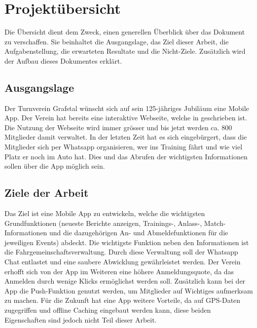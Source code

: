%
%

\chapter{Projektübersicht}\label{chap.projektuebersicht}
Die Übersicht dient dem Zweck, einen generellen Überblick über das Dokument zu verschaffen. Sie beinhaltet die Ausgangslage, das Ziel dieser Arbeit, die Aufgabenstellung, die erwarteten Resultate und die Nicht-Ziele. Zusätzlich wird der Aufbau dieses Dokumentes erklärt.

\section{Ausgangslage}\label{ausganglage}
Der Turnverein Grafstal wünscht sich auf sein 125-jähriges Jubiläum eine Mobile App. Der Verein hat bereits eine interaktive Webseite, welche in  geschrieben ist. Die Nutzung der Webseite wird immer grösser und bis jetzt werden ca. 800 Mitglieder damit verwaltet. In der letzten Zeit hat es sich eingebürgert, dass die Mitglieder sich per Whatsapp organisieren, wer ins Training fährt und wie viel Platz er noch im Auto hat. Dies und das Abrufen der wichtigsten Informationen sollen über die App möglich sein.

\section{Ziele der Arbeit}\label{ziele}
Das Ziel ist eine Mobile App zu entwickeln, welche die wichtigsten Grundfunktionen (neueste Berichte anzeigen, Trainings-, Anlass-, Match-Informationen und die dazugehörigen An- und Abmeldefunktionen für die jeweiligen Events) abdeckt. Die wichtigste Funktion neben den Informationen ist die Fahrgemeinschaftsverwaltung. Durch diese Verwaltung soll der Whatsapp Chat entlastet und eine saubere Abwicklung gewährleistet werden. Der Verein erhofft sich von der App im Weiteren eine höhere Anmeldungsquote, da das Anmelden durch wenige Klicks ermöglichst werden soll. Zusätzlich kann bei der App die Push-Funktion genutzt werden, um Mitglieder auf Wichtiges aufmerksam zu machen. Für die Zukunft hat eine App weitere Vorteile, da auf GPS-Daten zugegriffen und offline Caching eingebaut werden kann, diese beiden Eigenschaften sind jedoch nicht Teil dieser Arbeit.

